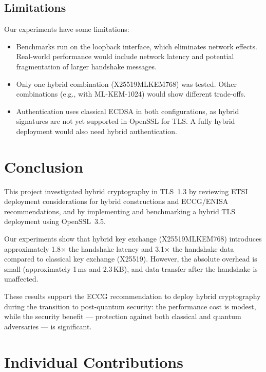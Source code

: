 \documentclass[11pt,a4paper]{article}
\begin{document}
\subsection{Limitations}

Our experiments have some limitations:

\begin{itemize}
    \item Benchmarks run on the loopback interface, which eliminates network effects. Real-world performance would include network latency and potential fragmentation of larger handshake messages.
    \item Only one hybrid combination (X25519MLKEM768) was tested. Other combinations (e.g., with ML-KEM-1024) would show different trade-offs.
    \item Authentication uses classical ECDSA in both configurations, as hybrid signatures are not yet supported in OpenSSL for TLS. A fully hybrid deployment would also need hybrid authentication.
\end{itemize}

\section{Conclusion}

This project investigated hybrid cryptography in TLS~1.3 by reviewing ETSI deployment considerations for hybrid constructions and ECCG/ENISA recommendations, and by implementing and benchmarking a hybrid TLS deployment using OpenSSL~3.5.

Our experiments show that hybrid key exchange (X25519MLKEM768) introduces approximately 1.8$\times$ the handshake latency and 3.1$\times$ the handshake data compared to classical key exchange (X25519). However, the absolute overhead is small (approximately 1\,ms and 2.3\,KB), and data transfer after the handshake is unaffected.

These results support the ECCG recommendation to deploy hybrid cryptography during the transition to post-quantum security: the performance cost is modest, while the security benefit --- protection against both classical and quantum adversaries --- is significant.

\section*{Individual Contributions}
\end{document}
